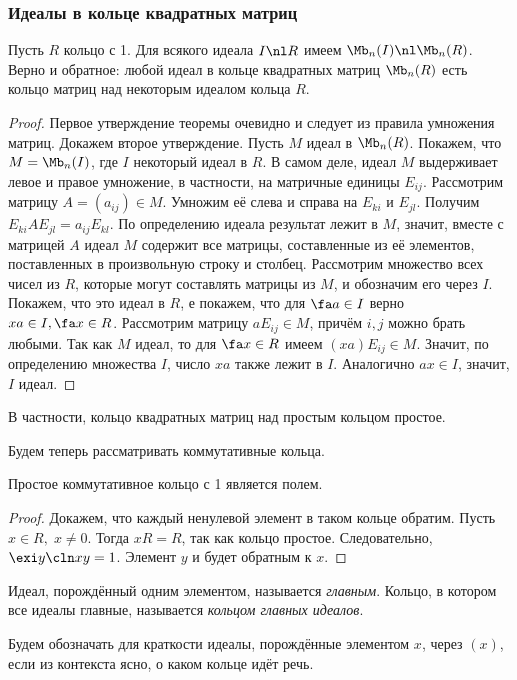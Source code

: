 \documentclass[a4paper]{article}
\begin{document}
\subsubsection{Идеалы в кольце квадратных матриц}

\begin{theorem}
Пусть $R$ кольцо с 1. Для всякого идеала $I \nl R$ имеем $\Mb_n(I) \nl \Mb_n(R)$. Верно и обратное:
любой идеал в кольце квадратных матриц $\Mb_n(R)$ есть кольцо матриц над некоторым идеалом кольца $R$.
\end{theorem}
\begin{proof}
Первое утверждение теоремы очевидно и следует из правила умножения матриц. Докажем второе утверждение.  Пусть
$M$ идеал в $\Mb_n(R)$. Покажем, что $M=\Mb_n(I)$, где $I$ некоторый идеал в $R$. В самом деле, идеал
$M$ выдерживает левое и правое умножение, в частности, на матричные единицы $E_{ij}$. Рассмотрим матрицу
$A=(a_{ij}) \in M$. Умножим её слева и справа на $E_{ki}$ и $E_{jl}$. Получим $E_{ki}AE_{jl}=a_{ij}E_{kl}$.
По определению идеала результат лежит в $M$, значит, вместе с матрицей $A$ идеал $M$ содержит все матрицы,
составленные из её элементов, поставленных в произвольную строку и столбец. Рассмотрим множество всех чисел
из $R$, которые могут составлять матрицы из $M$, и обозначим его через $I$. Покажем, что это идеал в $R$,
е покажем, что для $\fa a \in I$ верно $xa \in I, \fa x \in R$. Рассмотрим матрицу $aE_{ij} \in M$,
причём $i,j$ можно брать любыми. Так как $M$ идеал, то для $\fa x \in R$ имеем $(xa)E_{ij} \in M$.
Значит, по определению множества $I$, число $xa$ также лежит в $I$. Аналогично $ax \in I$, значит, $I$
идеал.
\end{proof}

\begin{imp}
В частности, кольцо квадратных матриц над простым кольцом простое.
\end{imp}

Будем теперь рассматривать коммутативные кольца.

\begin{stm}
Простое коммутативное кольцо с 1 является полем.
\end{stm}
\begin{proof}
Докажем, что каждый ненулевой элемент в таком кольце обратим. Пусть $x \in R, \; x \neq 0$. Тогда  $xR=R$,
так как кольцо простое. Следовательно, $\exi y\cln xy=1$. Элемент $y$ и будет обратным к $x$.
\end{proof}

\begin{df}
Идеал, порождённый одним элементом, называется \emph{главным}. Кольцо, в котором все идеалы главные,
называется \emph{кольцом главных идеалов}.
\end{df}
Будем обозначать для краткости идеалы, порождённые элементом $x$, через $(x)$, если из контекста ясно,  о
каком кольце идёт речь.
\end{document}

